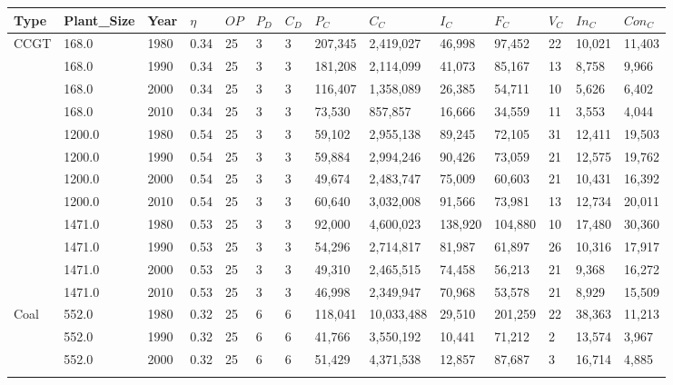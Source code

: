 \documentclass[sigconf]{acmart}
\begin{document}
\begin{table}[]
	\begin{tabular}{|l|l|l|l|l|l|l|l|l|l|l|l|l|l|}
		\hline
		Type & Plant\_Size & Year & $\eta$ & $OP$ & $P_D$ & $C_D$ & $P_C$ & $C_C$ & $I_C$ & $F_C$ & $V_C$ & $In_C$ & $Con_C$ \\ \hline
		\multirow{12}{*}{CCGT} & 168.0 & 1980 & 0.34 & 25 & 3 & 3 & 207,345 & 2,419,027 & 46,998 & 97,452 & 22 & 10,021 & 11,403 \\ \cline{2-14} 
		& 168.0 & 1990 & 0.34 & 25 & 3 & 3 & 181,208 & 2,114,099 & 41,073 & 85,167 & 13 & 8,758 & 9,966 \\ \cline{2-14} 
		& 168.0 & 2000 & 0.34 & 25 & 3 & 3 & 116,407 & 1,358,089 & 26,385 & 54,711 & 10 & 5,626 & 6,402 \\ \cline{2-14} 
		& 168.0 & 2010 & 0.34 & 25 & 3 & 3 & 73,530 & 857,857 & 16,666 & 34,559 & 11 & 3,553 & 4,044 \\ \cline{2-14} 
		& 1200.0 & 1980 & 0.54 & 25 & 3 & 3 & 59,102 & 2,955,138 & 89,245 & 72,105 & 31 & 12,411 & 19,503 \\ \cline{2-14} 
		& 1200.0 & 1990 & 0.54 & 25 & 3 & 3 & 59,884 & 2,994,246 & 90,426 & 73,059 & 21 & 12,575 & 19,762 \\ \cline{2-14} 
		& 1200.0 & 2000 & 0.54 & 25 & 3 & 3 & 49,674 & 2,483,747 & 75,009 & 60,603 & 21 & 10,431 & 16,392 \\ \cline{2-14} 
		& 1200.0 & 2010 & 0.54 & 25 & 3 & 3 & 60,640 & 3,032,008 & 91,566 & 73,981 & 13 & 12,734 & 20,011 \\ \cline{2-14} 
		& 1471.0 & 1980 & 0.53 & 25 & 3 & 3 & 92,000 & 4,600,023 & 138,920 & 104,880 & 10 & 17,480 & 30,360 \\ \cline{2-14} 
		& 1471.0 & 1990 & 0.53 & 25 & 3 & 3 & 54,296 & 2,714,817 & 81,987 & 61,897 & 26 & 10,316 & 17,917 \\ \cline{2-14} 
		& 1471.0 & 2000 & 0.53 & 25 & 3 & 3 & 49,310 & 2,465,515 & 74,458 & 56,213 & 21 & 9,368 & 16,272 \\ \cline{2-14} 
		& 1471.0 & 2010 & 0.53 & 25 & 3 & 3 & 46,998 & 2,349,947 & 70,968 & 53,578 & 21 & 8,929 & 15,509 \\ \hline
		\multirow{24}{*}{Coal} & 552.0 & 1980 & 0.32 & 25 & 6 & 6 & 118,041 & 10,033,488 & 29,510 & 201,259 & 22 & 38,363 & 11,213 \\ \cline{2-14} 
		& 552.0 & 1990 & 0.32 & 25 & 6 & 6 & 41,766 & 3,550,192 & 10,441 & 71,212 & 2 & 13,574 & 3,967 \\ \cline{2-14} 
		& 552.0 & 2000 & 0.32 & 25 & 6 & 6 & 51,429 & 4,371,538 & 12,857 & 87,687 & 3 & 16,714 & 4,885 \\ \cline{2-14} 

\end{tabular}
\end{table}
\end{document}
